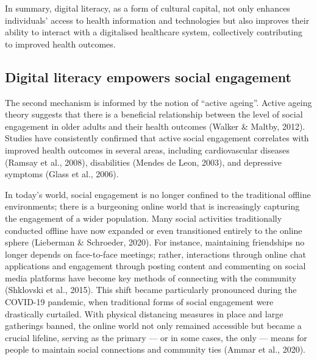 In summary, digital literacy, as a form of cultural capital, not only enhances individuals' access to health information and technologies but also improves their ability to interact with a digitalised healthcare system, collectively contributing to improved health outcomes.

\subsection{Digital literacy empowers social engagement}
The second mechanism is informed by the notion of ``active ageing”. Active ageing theory suggests that there is a beneficial relationship between the level of social engagement in older adults and their health outcomes (Walker \& Maltby, 2012). Studies have consistently confirmed that active social engagement correlates with improved health outcomes in several areas, including cardiovascular diseases (Ramsay et al., 2008), disabilities (Mendes de Leon, 2003), and depressive symptoms (Glass et al., 2006).

In today's world, social engagement is no longer confined to the traditional offline environments; there is a burgeoning online world that is increasingly capturing the engagement of a wider population. Many social activities traditionally conducted offline have now expanded or even transitioned entirely to the online sphere (Lieberman \& Schroeder, 2020). For instance, maintaining friendships no longer depends on face-to-face meetings; rather, interactions through online chat applications and engagement through posting content and commenting on social media platforms have become key methods of connecting with the community (Shklovski et al., 2015). This shift became particularly pronounced during the COVID-19 pandemic, when traditional forms of social engagement were drastically curtailed. With physical distancing measures in place and large gatherings banned, the online world not only remained accessible but became a crucial lifeline, serving as the primary — or in some cases, the only — means for people to maintain social connections and community ties (Ammar et al., 2020). 

